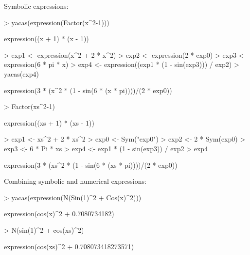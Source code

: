 \documentclass[]{article}
\begin{document}
Symbolic expressions:
\begin{Schunk}
\begin{Sinput}
> yacas(expression(Factor(x^2-1)))
\end{Sinput}
\begin{Soutput}
expression((x + 1) * (x - 1))
\end{Soutput}
\begin{Sinput}
> exp1 <- expression(x^2 + 2 * x^2)
> exp2 <- expression(2 * exp0)
> exp3 <- expression(6 * pi * x)
> exp4 <- expression((exp1 * (1 - sin(exp3))) / exp2)
> yacas(exp4)
\end{Sinput}
\begin{Soutput}
expression(3 * (x^2 * (1 - sin(6 * (x * pi))))/(2 * exp0))
\end{Soutput}
\end{Schunk}

\begin{Schunk}
\begin{Sinput}
> Factor(xs^2-1)
\end{Sinput}
\begin{Soutput}
expression((xs + 1) * (xs - 1))
\end{Soutput}
\begin{Sinput}
> exp1 <- xs^2 + 2 * xs^2
> exp0 <- Sym("exp0")
> exp2 <- 2 * Sym(exp0)
> exp3 <- 6 * Pi * xs
> exp4 <- exp1 * (1 - sin(exp3)) / exp2
> exp4
\end{Sinput}
\begin{Soutput}
expression(3 * (xs^2 * (1 - sin(6 * (xs * pi))))/(2 * exp0))
\end{Soutput}
\end{Schunk}



Combining symbolic and numerical expressions:
\begin{Schunk}
\begin{Sinput}
> yacas(expression(N(Sin(1)^2 + Cos(x)^2)))
\end{Sinput}
\begin{Soutput}
expression(cos(x)^2 + 0.7080734182)
\end{Soutput}
\end{Schunk}

\begin{Schunk}
\begin{Sinput}
> N(sin(1)^2 + cos(xs)^2)
\end{Sinput}
\begin{Soutput}
expression(cos(xs)^2 + 0.708073418273571)
\end{Soutput}
\end{Schunk}
\end{document}
